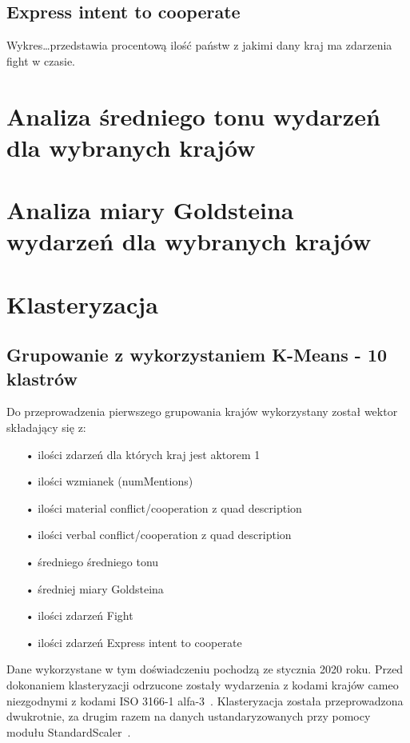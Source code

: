 \documentclass[11pt]{report}
\begin{document}
    \subsection{Express intent to cooperate}

    Wykres\ldots przedstawia procentową ilość państw z jakimi dany kraj ma zdarzenia fight w czasie.


    \section{Analiza średniego tonu wydarzeń dla wybranych krajów}


    \section{Analiza miary Goldsteina wydarzeń dla wybranych krajów}


    \section{Klasteryzacja}

    \subsection{Grupowanie z wykorzystaniem K-Means - 10 klastrów}

    Do przeprowadzenia pierwszego grupowania krajów wykorzystany został wektor składający się z:
    \begin{enumerate}
        \item[•] ilości zdarzeń dla których kraj jest aktorem 1
        \item[•] ilości wzmianek (numMentions)
        \item[•] ilości material conflict/cooperation z quad description
        \item[•] ilości verbal conflict/cooperation z quad description
        \item[•] średniego średniego tonu
        \item[•] średniej miary Goldsteina
        \item[•] ilości zdarzeń Fight
        \item[•] ilości zdarzeń Express intent to cooperate
    \end{enumerate}
    Dane wykorzystane w tym doświadczeniu pochodzą ze stycznia 2020 roku.
    Przed dokonaniem klasteryzacji odrzucone zostały wydarzenia z kodami krajów cameo niezgodnymi z kodami ISO 3166-1 alfa-3~\cite{iso_alfa3}.
    Klasteryzacja została przeprowadzona dwukrotnie, za drugim razem na danych ustandaryzowanych przy pomocy modułu StandardScaler~\cite{standardScaler}.
\end{document}
